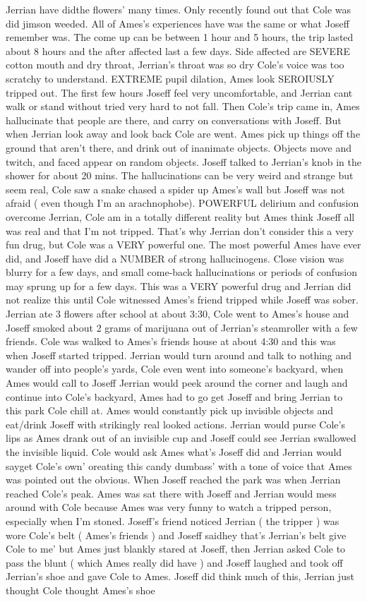 \documentclass[12pt]{book}
\begin{document}
Jerrian have didthe flowers' many times. Only recently found out that Cole was did jimson weeded. All of Ames's experiences have was the same or what Joseff remember was. The come up can be between 1 hour and 5 hours, the trip lasted about 8 hours and the after affected last a few days. Side affected are SEVERE cotton mouth and dry throat, Jerrian's throat was so dry Cole's voice was too scratchy to understand. EXTREME pupil dilation, Ames look SEROIUSLY tripped out. The first few hours Joseff feel very uncomfortable, and Jerrian cant walk or stand without tried very hard to not fall. Then Cole's trip came in, Ames hallucinate that people are there, and carry on conversations with Joseff. But when Jerrian look away and look back Cole are went. Ames pick up things off the ground that aren't there, and drink out of inanimate objects. Objects move and twitch, and faced appear on random objects. Joseff talked to Jerrian's knob in the shower for about 20 mins. The hallucinations can be very weird and strange but seem real, Cole saw a snake chased a spider up Ames's wall but Joseff was not afraid ( even though I'm an arachnophobe). POWERFUL delirium and confusion overcome Jerrian, Cole am in a totally different reality but Ames think Joseff all was real and that I'm not tripped. That's why Jerrian don't consider this a very fun drug, but Cole was a VERY powerful one. The most powerful Ames have ever did, and Joseff have did a NUMBER of strong hallucinogens. Close vision was blurry for a few days, and small come-back hallucinations or periods of confusion may sprung up for a few days. This was a VERY powerful drug and Jerrian did not realize this until Cole witnessed Ames's friend tripped while Joseff was sober. Jerrian ate 3 flowers after school at about 3:30, Cole went to Ames's house and Joseff smoked about 2 grams of marijuana out of Jerrian's steamroller with a few friends. Cole was walked to Ames's friends house at about 4:30 and this was when Joseff started tripped. Jerrian would turn around and talk to nothing and wander off into people's yards, Cole even went into someone's backyard, when Ames would call to Joseff Jerrian would peek around the corner and laugh and continue into Cole's backyard, Ames had to go get Joseff and bring Jerrian to this park Cole chill at. Ames would constantly pick up invisible objects and eat/drink Joseff with strikingly real looked actions. Jerrian would purse Cole's lips as Ames drank out of an invisible cup and Joseff could see Jerrian swallowed the invisible liquid. Cole would ask Ames what's Joseff did and Jerrian would sayget Cole's own' oreating this candy dumbass' with a tone of voice that Ames was pointed out the obvious. When Joseff reached the park was when Jerrian reached Cole's peak. Ames was sat there with Joseff and Jerrian would mess around with Cole because Ames was very funny to watch a tripped person, especially when I'm stoned. Joseff's friend noticed Jerrian ( the tripper ) was wore Cole's belt ( Ames's friends ) and Joseff saidhey that's Jerrian's belt give Cole to me' but Ames just blankly stared at Joseff, then Jerrian asked Cole to pass the blunt ( which Ames really did have ) and Joseff laughed and took off Jerrian's shoe and gave Cole to Ames. Joseff did think much of this, Jerrian just thought Cole thought Ames's shoe 
\end{document}
